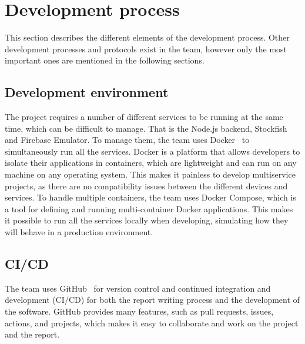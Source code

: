 \section{Development process}\label{sec:development-process}

This section describes the different elements of the development process.
Other development processes and protocols exist in the team, however only the most important ones are mentioned in the
following sections.


\subsection{Development environment}\label{subsec:development-environment}

The project requires a number of different services to be running at the same time, which can be difficult to manage.
That is the Node.js backend, Stockfish and Firebase Emulator.
To manage them, the team uses Docker~\cite{docker} to simultaneously run all the services.
Docker is a platform that allows developers to isolate their applications in containers, which are lightweight and can
run on any machine on any operating system.
This makes it painless to develop multiservice projects, as there are no compatibility issues between the different
devices and services.
To handle multiple containers, the team uses Docker Compose, which is a tool for defining and running multi-container
Docker applications.
This makes it possible to run all the services locally when developing, simulating how they will behave in a production
environment.


\subsection{CI/CD}\label{subsec:ci/cd}

The team uses GitHub~\cite{github} for version control and continued integration and development (CI/CD) for both the
report writing process and the development of the software.
GitHub provides many features, such as pull requests, issues, actions, and projects, which makes it easy to collaborate
and work on the project and the report.

